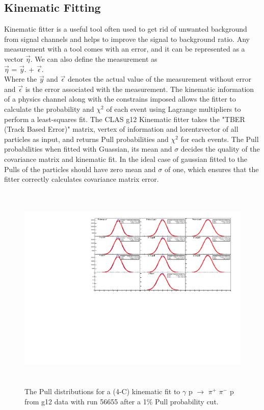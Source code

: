 \documentclass[12pt,a4paper]{amsbook}
\theoremstyle{definition}
\begin{document}
{\subsection{Kinematic Fitting}

Kinematic fitter is a useful tool often used to get rid of unwanted background from signal channels and helps to improve the signal to background ratio.  Any measurement with a tool comes with an error, and it can be represented as a vector  $\vec{\eta}$. We can also define the measurement as 
\\ $\vec{\eta}$ =  $\vec{y}$. +  $\vec{\epsilon}$.\\
Where the $\vec{y}$ and $\vec{\epsilon}$ denotes the actual value of the measurement without error and $\vec{\epsilon}$ is the error associated with the measurement. The kinematic information of a physics channel along with the constrains imposed allows the fitter to calculate the probability and $\chi^{2}$ of each event using Lagrange multipliers to perform a least-squares fit. The CLAS g12 Kinematic fitter takes the "TBER (Track Based Error)" matrix, vertex of information and lorentzvector of all particles as input, and returns Pull probabilities and $\chi^{2}$ for each events. The Pull probabilities when fitted with Guassian, its mean and $\sigma$ decides the quality of the covariance matrix and kinematic fit. In the ideal case of gaussian fitted to the Pulls of the particles should have  zero mean and $\sigma$ of one, which ensures that the fitter correctly calculates covariance matrix error. 
  
\begin{figure}[ht!]
\centerline{
\includegraphics[width=12cm,height=10cm]{Pulls_nothing.pdf}}
\caption{The Pull distributions for a (4-C) kinematic fit to $\gamma$ p $\rightarrow$ $\pi^{+}$ $\pi^{-}$ p from g12 data with run 56655 after a 1$\%$ Pull probability cut.}
\label{Fig3}
\end{figure}

}
\end{document}
